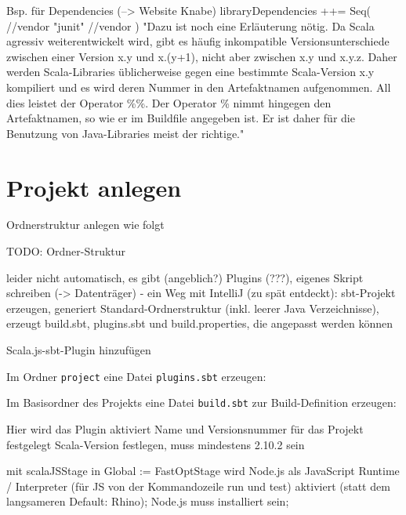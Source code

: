 \documentclass[a4paper, 12pt, listof=totoc, bibliography=totoc]{scrreprt}
\begin{document}
Bsp. für Dependencies (-->  Website Knabe)
	libraryDependencies ++= Seq(
       //vendor %
       "junit" %
       //vendor %
    )
    "Dazu ist noch eine Erläuterung nötig. Da Scala agressiv weiterentwickelt wird, gibt es häufig inkompatible Versionsunterschiede zwischen einer Version x.y und x.(y+1), nicht aber zwischen x.y und x.y.z. Daher werden Scala-Libraries üblicherweise gegen eine bestimmte Scala-Version x.y kompiliert und es wird deren Nummer in den Artefaktnamen aufgenommen. All dies leistet der Operator \%\%. Der Operator \% nimmt hingegen den Artefaktnamen, so wie er im Buildfile angegeben ist. Er ist daher für die Benutzung von Java-Libraries meist der richtige."



\section{Projekt anlegen}


Ordnerstruktur anlegen wie folgt

TODO: Ordner-Struktur

leider nicht automatisch, es gibt (angeblich?) Plugins (???), eigenes Skript schreiben (-> Datenträger)
	- ein Weg mit IntelliJ (zu spät entdeckt): sbt-Projekt erzeugen, generiert Standard-Ordnerstruktur (inkl. leerer Java Verzeichnisse), erzeugt build.sbt, plugins.sbt und build.properties, die angepasst werden können


Scala.js-sbt-Plugin hinzufügen

Im Ordner \texttt{project} eine Datei \texttt{plugins.sbt} erzeugen:


Im Basisordner des Projekts eine Datei \texttt{build.sbt} zur Build-Definition erzeugen:


Hier wird das Plugin aktiviert
Name und Versionsnummer für das Projekt festgelegt
Scala-Version festlegen, muss mindestens 2.10.2 sein

mit scalaJSStage in Global := FastOptStage wird Node.js als JavaScript Runtime / Interpreter (für JS von der Kommandozeile run und test) aktiviert (statt dem langsameren Default: Rhino); Node.js muss installiert sein;
\end{document}
